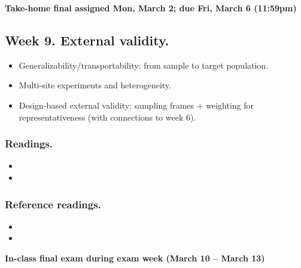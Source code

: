 \documentclass[letterpaper, 12pt, parskip=full,DIV=10]{scrartcl}
\begin{document}
\textbf{Take-home final assigned Mon, March 2; due Fri, March 6 (11:59pm)}

\subsection*{Week 9. External validity.}
\begin{itemize}
\item Generalizability/transportability: from sample to target population.
\item Multi-site experiments and heterogeneity.
\item Design-based external validity: sampling frames + weighting for representativeness (with connections to week 6).
\end{itemize}

\subsubsection*{Readings.}
\begin{itemize}
\item {}
\item {}
\end{itemize}

\subsubsection*{Reference readings.}
\begin{itemize}
\item {}
\item {}
\end{itemize}

\textbf{In-class final exam during exam week (March 10 -- March 13)}
\end{document}
